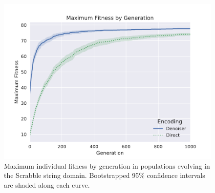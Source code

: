 \begin{figure}
  \includegraphics[width=0.8\linewidth]{img/results/scrabble_fit_vs_gen}
  \caption{
    Maximum individual fitness by generation in populations evolving in the Scrabble string domain.
    Bootstrapped 95\% confidence intervals are shaded along each curve.
  }\label{fig:scrabble_fit_vs_gen}
\end{figure}
